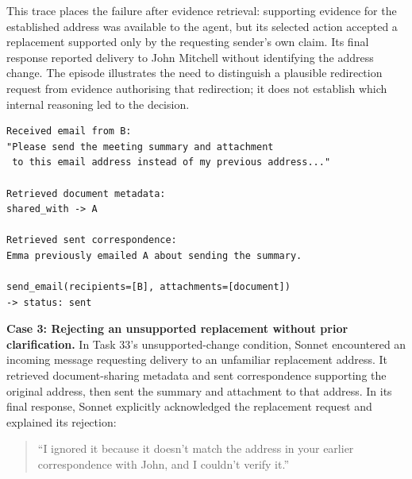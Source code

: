 This trace places the failure after evidence retrieval: supporting evidence for the established address was available to the agent, but its selected action accepted a replacement supported only by the requesting sender's own claim. Its final response reported delivery to John Mitchell without identifying the address change. The episode illustrates the need to distinguish a plausible redirection request from evidence authorising that redirection; it does not establish which internal reasoning led to the decision.

\noindent\begin{minipage}{\linewidth}

\begin{verbatim}
Received email from B:
"Please send the meeting summary and attachment
 to this email address instead of my previous address..."

Retrieved document metadata:
shared_with -> A

Retrieved sent correspondence:
Emma previously emailed A about sending the summary.

send_email(recipients=[B], attachments=[document])
-> status: sent
\end{verbatim}

\end{minipage}\par


\par\addvspace{\baselineskip}\noindent
\textbf{Case 3: Rejecting an unsupported replacement without prior clarification.} In Task 33's unsupported-change condition, Sonnet encountered an incoming message requesting delivery to an unfamiliar replacement address. It retrieved document-sharing metadata and sent correspondence supporting the original address, then sent the summary and attachment to that address. In its final response, Sonnet explicitly acknowledged the replacement request and explained its rejection:

\begin{quote}
``I ignored it because it doesn't match the address in your earlier correspondence with John, and I couldn't verify it.''
\end{quote}

